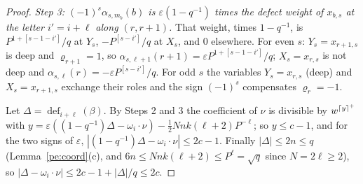 \documentclass[10pt]{amsart}
\theoremstyle{definition}
\theoremstyle{remark}
\providecommand{\phdef}{\operatorname{def}}
\begin{document}
\begin{proof}
\emph{Step 3: $(-1)^s\alpha_{s,m_b}(b)$ is $\varepsilon(1-q^{-1})$ times the defect weight of
$x_{b,s}$ at the letter $i'=i+\ell$ along $(r,r+1)$.} That weight, times $1-q^{-1}$, is
$P^{1+[s-1-i']}/q$ at $Y_s$, $-P^{[s-i']}/q$ at $X_s$, and $0$ elsewhere. For even $s$:
$Y_s=x_{r+1,s}$ is deep and $\varrho_{r+1}=1$, so $\alpha_{s,\ell+1}(r+1)=\varepsilon
P^{1+[s-1-i']}/q$; $X_s=x_{r,s}$ is not deep and $\alpha_{s,\ell}(r)=-\varepsilon P^{[s-i']}/q$.
For odd $s$ the variables $Y_s=x_{r,s}$ (deep) and $X_s=x_{r+1,s}$ exchange their roles and the
sign $(-1)^s$ compensates $\varrho_r=-1$.

Let $\Delta=\phdef_{i+\ell}(\beta)$. By Steps 2 and 3 the coefficient of $\nu$ is divisible by
$w^{\lceil y\rceil^{+}}$ with $y=\varepsilon((1-q^{-1})\Delta-\omega_i\cdot\nu)-\tfrac12Nnk(\ell+2)P^{-\ell}$;
so $y\le c-1$, and for the two signs of $\varepsilon$, $|(1-q^{-1})\Delta-\omega_i\cdot\nu|\le
2c-1$. Finally $|\Delta|\le2n\le q$ (Lemma~\ref{pe:coord}(c), and $6n\le Nnk(\ell+2)\le
P^\ell=\sqrt q$ since $N=2\ell\ge2$), so $|\Delta-\omega_i\cdot\nu|\le2c-1+|\Delta|/q\le2c$.
\end{proof}
\end{document}
